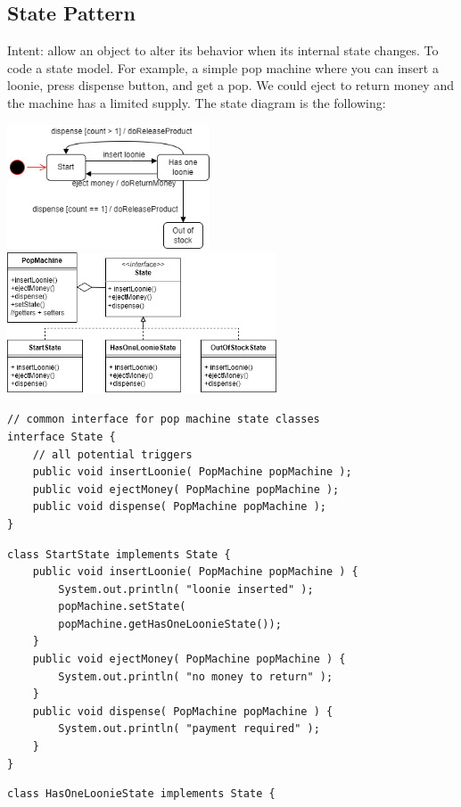 \documentclass[8pt, letterpaper, titlepage]{article}
\begin{document}
\begin{multicols*}{2}
    \subsection*{State Pattern}
    Intent: allow an object to alter its behavior when its internal state changes. To code a state model.
    For example, a simple pop machine where you can insert a loonie, press dispense button, and get a pop. We could eject to return money and the machine has a limited supply. The state diagram is the following:
    \begin{center} 
        \includegraphics[width=6cm]{proxystate.png}
        \includegraphics[width=8cm]{stateUML.png}
    \end{center}
    \begin{lstlisting}
// common interface for pop machine state classes
interface State {
    // all potential triggers
    public void insertLoonie( PopMachine popMachine );
    public void ejectMoney( PopMachine popMachine );
    public void dispense( PopMachine popMachine );
}
    \end{lstlisting}
    \begin{lstlisting}
class StartState implements State {
    public void insertLoonie( PopMachine popMachine ) {
        System.out.println( "loonie inserted" );
        popMachine.setState(
        popMachine.getHasOneLoonieState());
    }
    public void ejectMoney( PopMachine popMachine ) {
        System.out.println( "no money to return" );
    }
    public void dispense( PopMachine popMachine ) {
        System.out.println( "payment required" );
    }
}           
    \end{lstlisting}
    \begin{lstlisting}
class HasOneLoonieState implements State {

\end{lstlisting}
\end{multicols*}
\end{document}
